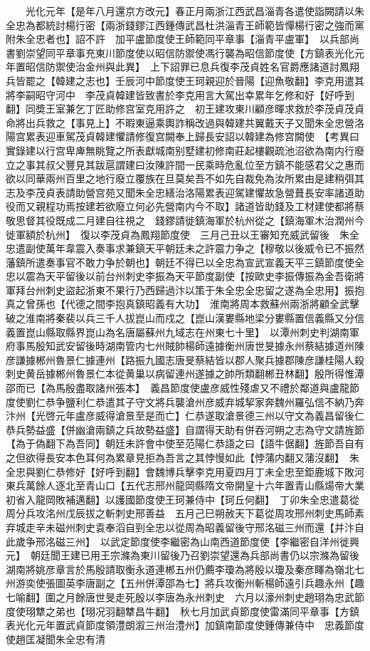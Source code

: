 　　光化元年【是年八月還京方改元】春正月兩浙江西武昌淄青各遣使詣闕請以朱全忠為都統討楊行密【兩浙錢鏐江西鍾傳武昌杜洪淄青王師範皆憚楊行密之強而黨附朱全忠者也】詔不許　加平盧節度使王師範同平章事【淄青平盧軍】　以兵部尚書劉崇望同平章事充東川節度使以昭信防禦使馮行襲為昭信節度使【方鎮表光化元年置昭信防禦使治金州與此異】　上下詔罪已息兵復李茂貞姓名官爵應諸道討鳳翔兵皆罷之【韓建之志也】壬辰河中節度使王珂親迎於晉陽【迎魚敬翻】李克用遣其將李嗣昭守河中　李茂貞韓建皆致書於李克用言大駕出幸累年乞修和好【好呼到翻】同奬王室兼乞丁匠助修宫室克用許之　初王建攻東川顧彦暉求救於李茂貞茂貞命將出兵救之【事見上】不暇東逼乘輿詐稱改過與韓建共翼戴天子又聞朱全忠營洛陽宫累表迎車駕茂貞韓建懼請修復宫闕奉上歸長安詔以韓建為修宫闕使　【考異曰實錄建以行宫卑庳無眺覽之所表獻城南别墅建初修南莊起樓觀疏池沼欲為南内行廢立之事其叔父豐見其跋扈謂建曰汝陳許間一民乘時危亂位至方鎮不能感君父之惠而欲以同華兩州百里之地行廢立覆族在旦莫矣吾不如先自裁免為汝所累由是建稍弭其志及李茂貞表請助營宫苑又聞朱全忠繕治洛陽累表迎駕建懼故急營葺長安率諸道助役而又親程功焉按建若欲廢立何必先營南内今不取】諸道皆助錢及工材建使都將蔡敬思督其役既成二月建自往視之　錢鏐請徙鎮海軍於杭州從之【鎮海軍木治潤州今徙軍額於杭州】　復以李茂貞為鳳翔節度使　三月己丑以王審知充威武留後　朱全忠遣副使萬年韋震入奏事求兼鎮天平朝廷未之許震力争之【穆敬以後威令已不振然藩鎮所遣奏事官不敢力争於朝也】朝廷不得已以全忠為宣武宣義天平三鎮節度使全忠以震為天平留後以前台州刺史李振為天平節度副使【按歐史李振傳振為金吾衛將軍拜台州刺史盜起浙東不果行乃西歸過汴以策于朱全忠全忠留之遂為全忠用】振抱真之曾孫也【代德之間李抱真鎮昭義有大功】　淮南將周本救蘇州兩浙將顧全武擊破之淮南將秦裴以兵三千人拔崑山而戍之【崑山漢婁縣地梁分婁縣置信義縣又分信義置崑山縣取縣界崑山為名唐屬蘇州九域志在州東七十里】　以潭州刺史判湖南軍府事馬殷知武安留後時湖南管内七州賊帥楊師遠據衡州唐世旻據永州蔡結據道州陳彦謙據郴州魯景仁據連州【路振九國志唐旻蔡結皆以郡人聚兵據郡陳彦謙桂陽人殺刺史黄岳據郴州魯景仁本從黄巢以病留連州遂據之帥所類翻郴丑林翻】殷所得惟潭邵而已【為馬殷盡取諸州張本】　義昌節度使盧彦威性殘虐又不禮於鄰道與盧龍節度使劉仁恭争鹽利仁恭遣其子守文將兵襲滄州彦威弃城挈家奔魏州羅弘信不納乃奔汴州【光啓元年盧彦威得滄景至是而亡】仁恭遂取滄景德三州以守文為義昌留後仁恭兵勢益盛【併幽滄兩鎮之兵故勢益盛】自謂得天助有併吞河朔之志為守文請旌節【為于偽翻下為吾同】朝廷未許會中使至范陽仁恭語之曰【語牛倨翻】旌節吾自有之但欲得長安本色耳何為累章見拒為吾言之其悖慢如此【悖蒲内翻又蒲沒翻】　朱全忠與劉仁恭修好【好呼到翻】會魏博兵擊李克用夏四月丁未全忠至鉅鹿城下敗河東兵萬餘人逐北至青山口【五代志邢州龍岡縣隋文帝開皇十六年置青山縣煬帝大業初省入龍岡敗補邁翻】以護國節度使王珂兼侍中【珂丘何翻】　丁卯朱全忠遣葛從周分兵攻洺州戊辰拔之斬刺史邢善益　五月己巳朔赦天下葛從周攻邢州刺史馬師素弃城走辛未磁州刺史袁奉滔自剄全忠以從周為昭義留後守邢洺磁三州而還【并汴自此歲争邢洺磁三州】　以武定節度使李繼密為山南西道節度使【李繼密自洋州徙興元】　朝廷聞王建已用王宗滌為東川留後乃召劉崇望還為兵部尚書仍以宗滌為留後　湖南將姚彦章言於馬殷請取衡永道連郴五州仍薦李瓊為將殷以瓊及秦彦睴為嶺北七州游奕使張圖英李唐副之【五州併潭邵為七】將兵攻衡州斬楊師遠引兵趣永州【趣七喻翻】圍之月餘唐世旻走死殷以李唐為永州刺史　六月以濠州刺史趙珝為忠武節度使珝犨之弟也【珝况羽翻犨昌牛翻】　秋七月加武貞節度使雷滿同平章事【方鎮表光化元年置武貞節度領澧朗溆三州治澧州】加鎮南節度使鍾傳兼侍中　忠義節度使趙匡凝聞朱全忠有清